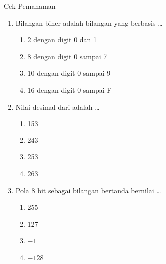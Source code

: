 \documentclass[aspectratio=169,11pt]{beamer}
\begin{document}
\begin{frame}{Cek Pemahaman}
\footnotesize
\begin{enumerate}
    \item Bilangan biner adalah bilangan yang berbasis \dots
          \begin{enumerate}
              \item 2 dengan digit 0 dan 1
              \item 8 dengan digit 0 sampai 7
              \item 10 dengan digit 0 sampai 9
              \item 16 dengan digit 0 sampai F
          \end{enumerate}

    \vspace{0.2em}
    \item Nilai desimal dari  adalah \dots
          \begin{enumerate}
              \item 153 \quad \item 243 \quad
              \item 253 \quad \item 263
          \end{enumerate}

    \vspace{0.2em}
    \item Pola 8 bit  sebagai bilangan bertanda
          bernilai \dots
          \begin{enumerate}
              \item 255 \quad \item 127 \quad
              \item $-1$ \quad \item $-128$
          \end{enumerate}
\end{enumerate}
\end{frame}
\end{document}
